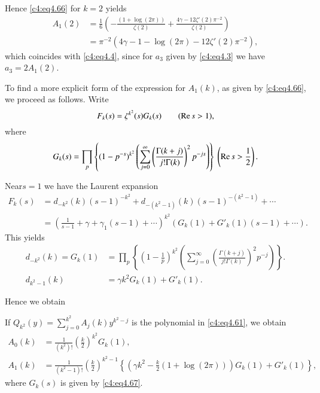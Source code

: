 Hence \eqref{c4:eq4.66} for $k=2$ yields
\begin{align*}
  A_1 (2) & = \frac{1}{6} \left(- \frac{(1+ \log (2 \pi))}{\zeta(2)}
   + \frac{4 \gamma - 12\zeta' (2) \pi^{-2}}{\zeta(2)} \right)\\[5pt]
   & = \pi^{-2} \left(4 \gamma -1 - \log (2 \pi) - 12 \zeta' (2)
   \pi^{-2}\right), 
\end{align*}
which coincides with \eqref{c4:eq4.4}, since for $a_3$ given by
\eqref{c4:eq4.3} we have $a_3 = 2A_1(2)$. 

To find a more explicit form of the expression for $A_1 (k)$, as given
by \eqref{c4:eq4.66}, we proceed as follows. Write
\begin{equation*}
  F_k (s)  = \zeta^{k^2} (s) G_k (s) \qquad (\operatorname{Re} s > 1),
\end{equation*}
where
\begin{equation}
  G_k (s) = \prod_p \left\{(1- p^{-s})^{k^2} \left(\sum_{j=0}^{\infty}
  \left(\frac{\Gamma (k+j)}{j! \Gamma (k)} \right)^2 p^{-js}\right)
  \right\} \ \left(\operatorname{Re} s > \frac{1}{2}\right).\label{c4:eq4.67} 
\end{equation}

Near\pageoriginale $s=1$ we have the Laurent expansion
\begin{align*}
  F_k (s) & = d_{-k^2} (k) (s-1)^{-k^2} + d_{- (k^2-1)} (k)
  (s-1)^{-(k^2 -1)} + \cdots\\
  & = \left(\frac{1}{s-1} + \gamma + \gamma_1 (s-1) + \cdots
  \right)^{k^2} \left(G_k (1) + G'_k (1) (s-1)+ \cdots\right).
\end{align*}
\indent
This yields 
\begin{align*}
  d_{-k^2} (k) = G_k (1) & = \prod_p \left\{\left(1-
  \frac{1}{p}\right)^{k^2} \left(\sum_{j=0}^\infty
  \left(\frac{\Gamma(k+j)}{j! \Gamma (k)} \right)^2 p^{-j} \right)
  \right\}.\\
  d_{k^2 -1}(k) & = \gamma k^2 G_k (1) + G'_k (1).
\end{align*}

Hence we obtain
\begin{thm}\label{c4:thm4.4}
  If $Q_{k^2} (y)= \sum\limits_{j=0}^{k^2} A_j (k) y^{k^2-j}$ is the
  polynomial in \eqref{c4:eq4.61}, we obtain 
  \begin{align*}
    A_0 (k) & = \frac{1}{(k^2)!} \left(\frac{k}{2}\right)^{k^2} G_k
    (1),\\
    A_1 (k) & = \frac{1}{(k^2 -1)!} \left(\frac{k}{2} \right)^{k^2-1}
    \left\{ \left( \gamma k^2 - \frac{k}{2} (1+ \log (2 \pi))\right)
    G_k (1) + G'_k (1) \right\},
  \end{align*}
  where $G_k (s)$ is given by \eqref{c4:eq4.67}.
\end{thm}

